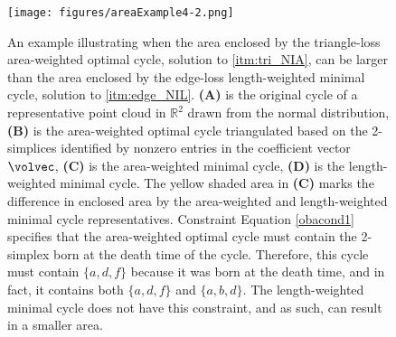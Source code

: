 \begin{figure}[h!]
\begin{center}
\texttt{[image: figures/areaExample4-2.png]}
\end{center}
\caption{An example illustrating when the area enclosed by the triangle-loss area-weighted optimal cycle, solution to \pr \ref{itm:tri_NIA}, can be larger than the area enclosed by the edge-loss length-weighted minimal cycle, solution to \pr \ref{itm:edge_NIL}. \textbf{(A)} is the original cycle of a representative point cloud in $\mathbb{R}^2$ drawn from the normal distribution, \textbf{(B)} is the area-weighted optimal cycle triangulated based on the 2-simplices identified by nonzero entries in the coefficient vector $\volvec$, \textbf{(C)} is the area-weighted minimal cycle, \textbf{(D)} is the length-weighted minimal cycle. The yellow shaded area in \textbf{(C)} marks the difference in enclosed area by the area-weighted and length-weighted minimal cycle representatives. %
Constraint Equation \eqref{obacond1} specifies that the area-weighted optimal cycle must contain the 2-simplex born at the death time of the cycle. Therefore, this cycle must contain $\{a,d,f\}$ because it was born at the death time, and in fact, it contains both  $\{a,d,f\}$ and  $\{a,b,d\}$. The length-weighted minimal cycle does not have this constraint, and as such, can result in a smaller area. %
}\label{fig:areaExample}
\end{figure}

